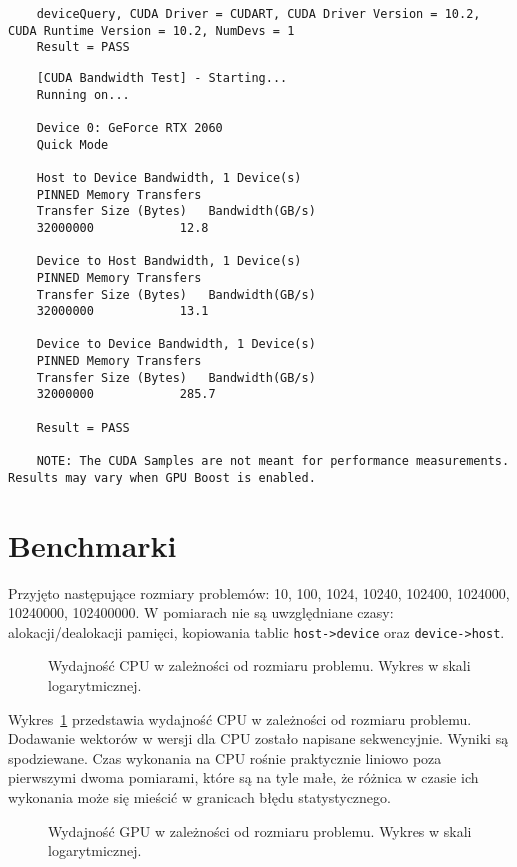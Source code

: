 \documentclass{article}
\begin{document}
\begin{lstlisting}
    deviceQuery, CUDA Driver = CUDART, CUDA Driver Version = 10.2, CUDA Runtime Version = 10.2, NumDevs = 1
    Result = PASS
    \end{lstlisting}
    \begin{lstlisting}
    [CUDA Bandwidth Test] - Starting...
    Running on...

    Device 0: GeForce RTX 2060
    Quick Mode

    Host to Device Bandwidth, 1 Device(s)
    PINNED Memory Transfers
    Transfer Size (Bytes)	Bandwidth(GB/s)
    32000000			12.8

    Device to Host Bandwidth, 1 Device(s)
    PINNED Memory Transfers
    Transfer Size (Bytes)	Bandwidth(GB/s)
    32000000			13.1

    Device to Device Bandwidth, 1 Device(s)
    PINNED Memory Transfers
    Transfer Size (Bytes)	Bandwidth(GB/s)
    32000000			285.7

    Result = PASS

    NOTE: The CUDA Samples are not meant for performance measurements. Results may vary when GPU Boost is enabled.
    \end{lstlisting}

    \section{Benchmarki}
    Przyjęto następujące rozmiary problemów: 10, 100, 1024, 10240, 102400,
    1024000, 10240000, 102400000.
    W pomiarach nie są uwzględniane czasy: alokacji/dealokacji pamięci, kopiowania
    tablic \texttt{host->device} oraz  \texttt{device->host}.
    \begin{figure}[H]
        \centering
        
        \caption{Wydajność CPU w zależności od rozmiaru problemu.
        Wykres w skali logarytmicznej.}
        \label{fig:cpu-performance}
    \end{figure}

    Wykres~\ref{fig:cpu-performance} przedstawia wydajność CPU w zależności od rozmiaru problemu.
    Dodawanie wektorów w wersji dla CPU zostało napisane sekwencyjnie.
    Wyniki są spodziewane.
    Czas wykonania na CPU rośnie praktycznie liniowo poza pierwszymi dwoma pomiarami,
    które są na tyle małe, że różnica w czasie ich wykonania może się mieścić w granicach
    błędu statystycznego.

    \begin{figure}[H]
        \centering
        
        \caption{Wydajność GPU w zależności od rozmiaru problemu.
        Wykres w skali logarytmicznej.}
        \label{fig:gpu-performance}
    \end{figure}
\end{document}

